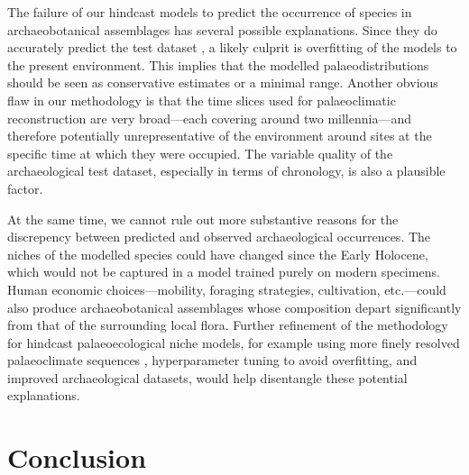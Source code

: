 \documentclass[
  authoryear,
  review]{elsarticle}
\begin{document}
The failure of our hindcast models to predict the occurrence of species
in archaeobotanical assemblages has several possible explanations. Since
they do accurately predict the test dataset , a likely culprit is
overfitting of the models to the present environment. This implies that
the modelled palaeodistributions should be seen as conservative
estimates or a minimal range. Another obvious flaw in our methodology is
that the time slices used for palaeoclimatic reconstruction are very
broad---each covering around two millennia---and therefore potentially
unrepresentative of the environment around sites at the specific time at
which they were occupied. The variable quality of the archaeological
test dataset, especially in terms of chronology, is also a plausible
factor.

At the same time, we cannot rule out more substantive reasons for the
discrepency between predicted and observed archaeological occurrences.
The niches of the modelled species could have changed since the Early
Holocene, which would not be captured in a model trained purely on
modern specimens. Human economic choices---mobility, foraging
strategies, cultivation, etc.---could also produce archaeobotanical
assemblages whose composition depart significantly from that of the
surrounding local flora. Further refinement of the methodology for
hindcast palaeoecological niche models, for example using more finely
resolved palaeoclimate sequences \citep[e.g.][]{KargerEtAl2023},
hyperparameter tuning to avoid overfitting, and improved archaeological
datasets, would help disentangle these potential explanations.

\section{Conclusion}\label{conclusion}
\end{document}
